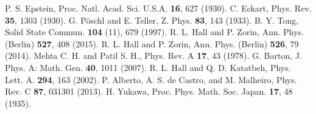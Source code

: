 \documentclass[amsmath,amssymb,superscriptaddress,showkeys, showpacs, aps, nofootinbib]{revtex4}
\begin{document}
\begin{thebibliography}{99}
 P. S. Epstein, Proc. Natl. Acad. Sci. U.S.A. {\bf 16}, 627 (1930).
 C. Eckart, Phys. Rev. {\bf 35}, 1303 (1930).
 G. P\"{o}schl and E. Teller, Z. Phys. {\bf 83}, 143 (1933).
 B. Y. Tong, Solid State Commun. {\bf 104} (11), 679 (1997).
 R. L. Hall and P. Zorin, Ann. Phys. (Berlin) {\bf 527}, 408 (2015).
 R. L. Hall and P. Zorin, Ann. Phys. (Berlin) {\bf 526}, 79 (2014).
 Mehta C. H. and Patil S. H., Phys. Rev. A {\bf 17}, 43 (1978).
 G. Barton, J. Phys. A: Math. Gen. {\bf 40}, 1011 (2007).
 R. L. Hall and Q. D. Katatbeh, Phys. Lett. A. {\bf 294}, 163 (2002).
 P. Alberto, A. S. de Castro, and M. Malheiro, Phys. Rev. C {\bf 87}, 031301 (2013).
 H. Yukawa, Proc. Phys. Math. Soc. Japan. {\bf 17}, 48 (1935).
\end{thebibliography}
\end{document}
